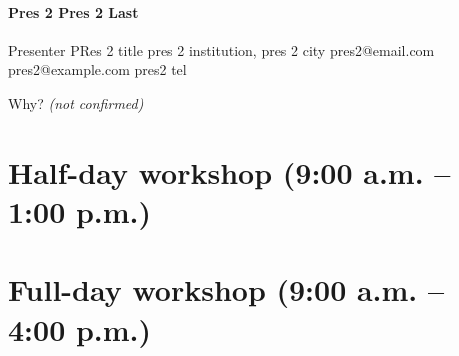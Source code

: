 \documentclass{report}
\begin{document}
              
                \subsubsection*{ Pres 2 Pres 2 Last }
                Presenter\newline
                PRes 2 title\newline
                pres 2 institution, pres 2 city
                \newline
                pres2@email.com\newline
                pres2@example.com\newline
                pres2 tel\newline

                Why?
                \emph{ (not confirmed) }
              

              

              
    \newpage
    \chapter*{ Half-day workshop (9:00 a.m. – 1:00 p.m.) }

      
        
        
    \newpage
    \chapter*{ Full-day workshop (9:00 a.m. – 4:00 p.m.) }

      
        
        
\end{document}
